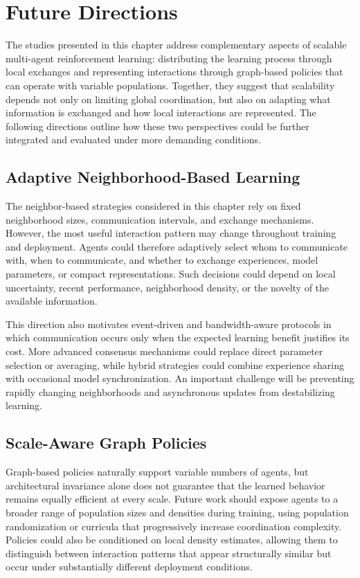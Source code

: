 \section{Future Directions}
\label{sec:scalable-rl-future}

The studies presented in this chapter address complementary aspects of scalable multi-agent reinforcement learning: 
 distributing the learning process through local exchanges and representing interactions through graph-based policies 
 that can operate with variable populations.
%
Together, 
 they suggest that scalability depends not only on limiting global coordination, 
 but also on adapting what information is exchanged and how local interactions are represented.
%
The following directions outline how these two perspectives could be further integrated 
 and evaluated under more demanding conditions.

\subsection{Adaptive Neighborhood-Based Learning}

The neighbor-based strategies considered in this chapter rely on fixed neighborhood sizes, 
 communication intervals, and exchange mechanisms.
%
However,
 the most useful interaction pattern may change throughout training and deployment.
%
Agents could therefore adaptively select whom to communicate with, 
 when to communicate, and whether to exchange experiences, model parameters, or compact representations.
%
Such decisions could depend on local uncertainty, recent performance, 
 neighborhood density, or the novelty of the available information.

This direction also motivates event-driven and bandwidth-aware protocols 
 in which communication occurs only when the expected learning benefit justifies its cost.
%
More advanced consensus mechanisms could replace direct parameter selection or averaging,
 while hybrid strategies could combine experience sharing with occasional model synchronization.
%
An important challenge will be preventing rapidly changing neighborhoods
 and asynchronous updates from destabilizing learning.

\subsection{Scale-Aware Graph Policies}

Graph-based policies naturally support variable numbers of agents, 
 but architectural invariance alone does not guarantee that the learned behavior remains equally efficient at every scale.
%
Future work should expose agents to a broader range of population sizes and densities during training,
 using population randomization or curricula that progressively increase coordination complexity.
%
Policies could also be conditioned on local density estimates,
 allowing them to distinguish between interaction patterns that appear structurally similar
  but occur under substantially different deployment conditions.


